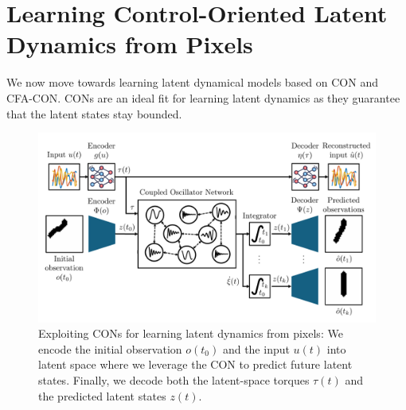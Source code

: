 \section{Learning Control-Oriented Latent Dynamics from Pixels}\label{sec:con:learning_latent_space_dynamics}
We now move towards learning latent dynamical models based on \gls{CON} and \gls{CFA-CON}.
\glspl{CON} are an ideal fit for learning latent dynamics as they guarantee that the latent states stay bounded. 

\begin{figure}[t]
    \centering
    \includegraphics[width=1.0\linewidth]{con/figures/autoencoder/blockdiagram_autoencoder_v1_cropped.pdf}
    \caption{Exploiting \glspl{CON} for learning latent dynamics from pixels: We encode the initial observation $o(t_0)$ and the input $u(t)$ into latent space where we leverage the \gls{CON} to predict future latent states. Finally, we decode both the latent-space torques $\tau(t)$ and the predicted latent states $z(t)$.}
    \label{fig:con:blockdiagram_autoencoder}
\end{figure}

